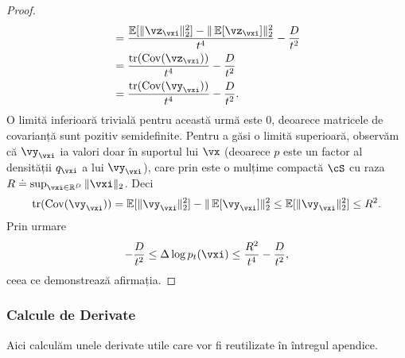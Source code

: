\documentclass[../../book-main_ro.tex]{subfiles}
\begin{document}
\begin{proof}
\begin{align}
        &= \frac{\Ex[\norm{\vz_{\vxi}}_{2}^{2}] - \norm{\Ex[\vz_{\vxi}]}_{2}^{2}}{t^{4}} - \frac{D}{t^{2}} \\
        &= \frac{\tr(\Cov(\vz_{\vxi}))}{t^{4}} - \frac{D}{t^{2}} \\
        &= \frac{\tr(\Cov(\vy_{\vxi}))}{t^{4}} - \frac{D}{t^{2}}.
    \end{align}
    O limită inferioară trivială pentru această urmă este \(0\), deoarece matricele de covarianță sunt pozitiv semidefinite. Pentru a găsi o limită superioară, observăm că \(\vy_{\vxi}\) ia valori doar în suportul lui \(\vx\) (deoarece \(p\) este un factor al densității \(q_{\vxi}\) a lui \(\vy_{\vxi}\)), care prin  este o mulțime compactă \(\cS\) cu raza \(R \doteq \sup_{\vxi \in \R^{D}}\norm{\vxi}_{2}\). Deci
    \begin{equation}
        \tr(\Cov(\vy_{\vxi})) = \Ex[\norm{\vy_{\vxi}}_{2}^{2}] - \norm{\Ex[\vy_{\vxi}]}_{2}^{2} \leq \Ex[\norm{\vy_{\vxi}}_{2}^{2}] \leq R^{2}.
    \end{equation}
    Prin urmare
    \begin{equation}
        -\frac{D}{t^{2}} \leq \Delta \log p_{t}(\vxi) \leq \frac{R^{2}}{t^{4}} - \frac{D}{t^{2}},
    \end{equation}
    ceea ce demonstrează afirmația.
\end{proof}

\subsubsection{Calcule de Derivate}

Aici calculăm unele derivate utile care vor fi reutilizate în întregul apendice.
\end{document}
